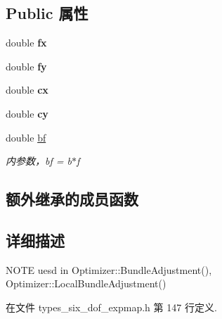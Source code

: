 \subsection*{Public 属性}
\begin{DoxyCompactItemize}
\item 
\hypertarget{classg2o_1_1EdgeStereoSE3ProjectXYZ_a4fe9f6810d2cc1b4489f84853445e85f}{double {\bfseries fx}}\label{classg2o_1_1EdgeStereoSE3ProjectXYZ_a4fe9f6810d2cc1b4489f84853445e85f}

\item 
\hypertarget{classg2o_1_1EdgeStereoSE3ProjectXYZ_a4e5b984e84437680b1f589822b4c0700}{double {\bfseries fy}}\label{classg2o_1_1EdgeStereoSE3ProjectXYZ_a4e5b984e84437680b1f589822b4c0700}

\item 
\hypertarget{classg2o_1_1EdgeStereoSE3ProjectXYZ_a0d786d2f349f8d4991be5303ad2b3c5d}{double {\bfseries cx}}\label{classg2o_1_1EdgeStereoSE3ProjectXYZ_a0d786d2f349f8d4991be5303ad2b3c5d}

\item 
\hypertarget{classg2o_1_1EdgeStereoSE3ProjectXYZ_a220dd625eb7479cc1dabb92a96a6664c}{double {\bfseries cy}}\label{classg2o_1_1EdgeStereoSE3ProjectXYZ_a220dd625eb7479cc1dabb92a96a6664c}

\item 
\hypertarget{classg2o_1_1EdgeStereoSE3ProjectXYZ_afc94291834aa40d18205e61ac802cbfc}{double \hyperlink{classg2o_1_1EdgeStereoSE3ProjectXYZ_afc94291834aa40d18205e61ac802cbfc}{bf}}\label{classg2o_1_1EdgeStereoSE3ProjectXYZ_afc94291834aa40d18205e61ac802cbfc}

\begin{DoxyCompactList}\small\item\em 内参数，bf = b$\ast$f \end{DoxyCompactList}\end{DoxyCompactItemize}
\subsection*{额外继承的成员函数}


\subsection{详细描述}
N\-O\-T\-E uesd in Optimizer\-::\-Bundle\-Adjustment(), Optimizer\-::\-Local\-Bundle\-Adjustment() 

在文件 types\-\_\-six\-\_\-dof\-\_\-expmap.\-h 第 147 行定义.




